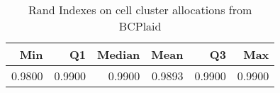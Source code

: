 \begin{table}[ht]
\caption{Rand Indexes on cell cluster allocations from BCPlaid}
\centering
\begin{tabular}{rrrrrr}
  \toprule
Min & Q1 & Median & Mean & Q3 & Max \\ 
  \midrule
0.9800 & 0.9900 & 0.9900 & 0.9893 & 0.9900 & 0.9900 \\ 
   \bottomrule
\end{tabular}
\end{table}
